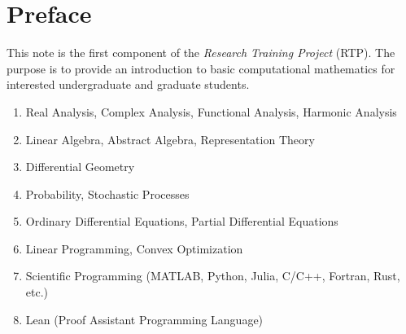 \chapter*{Preface}

This note is the first component of the \emph{Research Training Project} (RTP).  The purpose is to provide an introduction to basic computational mathematics for interested undergraduate and graduate students. 

\vspace{2cm}

{}

\begin{enumerate}
    \item Real Analysis, Complex Analysis, Functional Analysis, Harmonic Analysis
    \item Linear Algebra, Abstract Algebra, Representation Theory
    \item Differential Geometry
    \item Probability, Stochastic Processes
    \item Ordinary Differential Equations, Partial Differential Equations 
    \item Linear Programming, Convex Optimization
    \item Scientific Programming (MATLAB, Python, Julia, C/C++, Fortran, Rust, etc.)
    \item Lean (Proof Assistant Programming Language)
\end{enumerate}